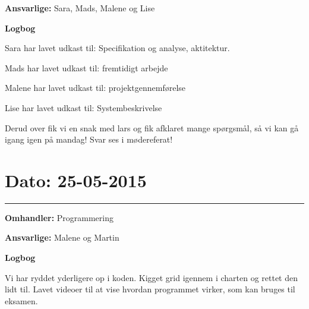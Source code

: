 \textbf{Ansvarlige:} Sara, Mads, Malene og Lise

\textbf{Logbog}

Sara har lavet udkast til: Specifikation og analyse, aktitektur. 

Mads har lavet udkast til: fremtidigt arbejde 

Malene har lavet udkast til: projektgennemførelse 

Lise har lavet udkast til: Systembeskrivelse 

Derud over fik vi en snak med lars og fik afklaret mange spørgsmål, så vi kan gå igang igen på mandag! Svar ses i mødereferat!  


\section{Dato: 25-05-2015}
\hrule

\textbf{Omhandler:} Programmering

\textbf{Ansvarlige:} Malene og Martin

\textbf{Logbog}

Vi har ryddet yderligere op i koden. Kigget grid igennem i charten og rettet den lidt til. Lavet videoer til at vise hvordan programmet virker, som kan bruges til eksamen.



 